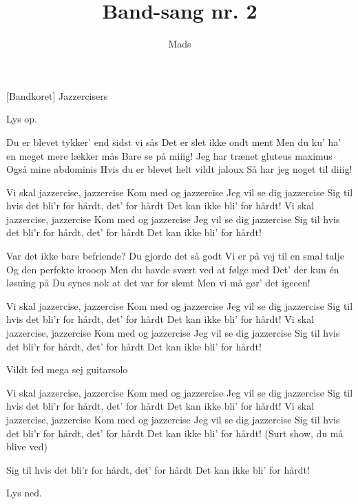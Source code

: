 \documentclass{ucph-revy}
\author{Mads}
\title{Band-sang nr. 2}
\begin{document}
\maketitle
	\begin{roles}
		[Bandkoret] Jazzercisers
	\end{roles}

	

\begin{song}

\scene Lys op.

 Du er blevet tykker’ end sidst vi sås
Det er slet ikke ondt ment
Men du ku’ ha’ en meget mere lækker mås
Bare se på miiig!
Jeg har trænet gluteus maximus
Også mine abdominis
Hvis du er blevet helt vildt jaloux
Så har jeg noget til diiig!



Vi skal jazzercise, jazzercise
Kom med og jazzercise
Jeg vil se dig jazzercise
Sig til hvis det bli’r for hårdt, det’ for hårdt
Det kan ikke bli’ for hårdt!
Vi skal jazzercise, jazzercise
Kom med og jazzercise
Jeg vil se dig jazzercise
Sig til hvis det bli’r for hårdt, det’ for hårdt
Det kan ikke bli’ for hårdt!


Var det ikke bare befriende?
Du gjorde det så godt
Vi er på vej til en smal talje
Og den perfekte krooop
Men du havde svært ved at følge med
Det’ der kun én løsning på
Du synes nok at det var for slemt
Men vi må gør’ det igeeen!


Vi skal jazzercise, jazzercise
Kom med og jazzercise
Jeg vil se dig jazzercise
Sig til hvis det bli’r for hårdt, det’ for hårdt
Det kan ikke bli’ for hårdt!
Vi skal jazzercise, jazzercise
Kom med og jazzercise
Jeg vil se dig jazzercise
Sig til hvis det bli’r for hårdt, det’ for hårdt
Det kan ikke bli’ for hårdt!

\scene Vildt fed mega sej guitarsolo

Vi skal jazzercise, jazzercise
Kom med og jazzercise
Jeg vil se dig jazzercise
Sig til hvis det bli’r for hårdt, det’ for hårdt
Det kan ikke bli’ for hårdt!
Vi skal jazzercise, jazzercise
Kom med og jazzercise
Jeg vil se dig jazzercise
Sig til hvis det bli’r for hårdt, det’ for hårdt
Det kan ikke bli’ for hårdt!
(Surt show, du må blive ved)

Sig til hvis det bli’r for hårdt, det’ for hårdt
Det kan ikke bli’ for hårdt!


\scene Lys ned. %

\end{song}
\end{document}
